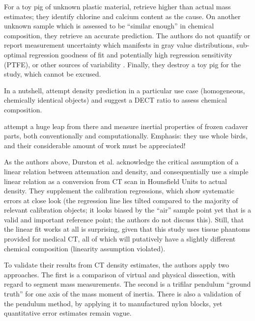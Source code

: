 For a toy pig of unknown plastic material, \citet{DuPlessis2013} retrieve higher than actual mass estimates; they identify chlorine and calcium content as the cause.
On another unknown sample which is assessed to be ``similar enough'' in chemical composition, they retrieve an accurate prediction.
The authors do not quantify or report measurement uncertainty which manifests in gray value distributions, sub-optimal regression goodness of fit and potentially high regression sensitivity (PTFE), or other sources of variability \citep{Macaulay2017}.
Finally, they destroy a toy pig for the study, which cannot be excused.

In a nutshell, \citet{DuPlessis2013} attempt density prediction in a particular use case (homogeneous, chemically identical objects) and suggest a DECT ratio to assess chemical composition.

\medskip
\citet{Durston2022} attempt a huge leap from there and measure inertial properties of frozen cadaver parts, both conventionally and computationally.
Emphasis: they use whole birds, and their considerable amount of work must be appreciated!

As the authors above, Durston et al. acknowledge the critical assumption of a linear relation between attenuation and density, and consequentially use a simple linear relation as a conversion from CT scan in Hounsfield Units to actual density.
They supplement the calibration regressions, which show systematic errors at close look (the regression line lies tilted compared to the majority of relevant calibration objects; it looks biased by the ``air'' sample point yet that is a valid and important reference point; the authors do not discuss this).
Still, that the linear fit works at all is surprising, given that this study uses tissue phantoms provided for medical CT, all of which will putatively have a slightly different chemical composition (linearity assumption violated).

To validate their results from CT density estimates, the authors apply two approaches.
The first is a comparison of virtual and physical dissection, with regard to segment mass measurements.
The second is a trifilar pendulum ``ground truth'' for one axis of the mass moment of inertia.
There is also a validation of the pendulum method, by applying it to manufactured nylon blocks, yet quantitative error estimates remain vague.

